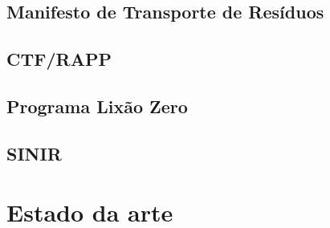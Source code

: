 \subsection{Manifesto de Transporte de Resíduos}

\subsection{CTF/RAPP}

\subsection{Programa Lixão Zero}

\subsection{SINIR}

\section{Estado da arte}
